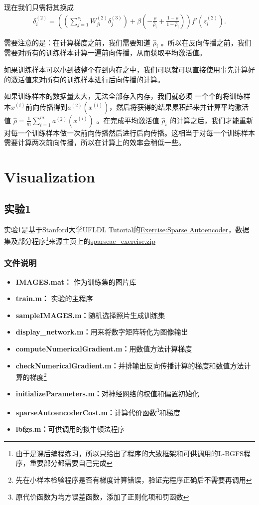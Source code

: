 现在我们只需将其换成
\begin{align}
\delta^{(2)}_i =
  \left( \left( \sum_{j=1}^{s_{2}} W^{(2)}_{ji} \delta^{(3)}_j \right)
+ \beta \left( - \frac{\rho}{\hat\rho_i} + \frac{1-\rho}{1-\hat\rho_i} \right) \right) f'(z^{(2)}_i) .
\nonumber \end{align}

需要注意的是：在计算梯度之前，我们需要知道 $ \hat\rho_i $ 。所以在反向传播之前，我们需要对所有的训练样本计算一遍前向传播，从而获取平均激活值。

如果训练样本可以小到被整个存到内存之中，我们可以就可以直接使用事先计算好的激活值来对所有的训练样本进行后向传播的计算。

如果训练样本的数据量太大，无法全部存入内存，我们就必须
一个个的将训练样本$x^{(i)}$前向传播得到$ a^{(2)}(x^{(i)})$，然后将获得的结果累积起来并计算平均激活值 $ \hat\rho = \frac{1}{m} \sum_{i=1}^m  a^{(2)}(x^{(i)})$ 。在完成平均激活值 $ \hat\rho_i$  的计算之后，我们才能重新对每一个训练样本做一次前向传播然后进行后向传播。这相当于对每一个训练样本需要计算两次前向传播，所以在计算上的效率会稍低一些。


\section{Visualization}
\subsection{实验1}
实验1是基于Stanford大学UFLDL Tutorial的\href{http://ufldl.stanford.edu/wiki/index.php/Exercise:Sparse_Autoencoder}{Exercise:Sparse Autoencoder}，数据集及部分程序\footnote{由于是课后编程练习，所以只给出了程序的大致框架和可供调用的L-BGFS程序，重要部分都需要自己完成}来源主页上的\href{http://ufldl.stanford.edu/wiki/resources/sparseae_exercise.zip}{sparseae\_exercise.zip}

\subsubsection*{文件说明}
\begin{itemize}
\item \textbf{IMAGES.mat：} 作为训练集的图片库
 \item \textbf{train.m：} 实验的主程序
 \item \textbf{sampleIMAGES.m：}随机选择照片生成训练集
  \item \textbf{display\_network.m：}用来将数字矩阵转化为图像输出
 \item \textbf{computeNumericalGradient.m：}用数值方法计算梯度
 \item \textbf{checkNumericalGradient.m：}并排输出反向传播计算的梯度和数值方法计算的梯度\footnote{先在小样本检验程序是否有梯度计算错误，验证完程序正确后不需要再调用}
 \item \textbf{initializeParameters.m：}对神经网络的权值和偏置初始化
 \item \textbf{sparseAutoencoderCost.m：}计算代价函数\footnote{原代价函数为均方误差函数，添加了正则化项和罚函数}和梯度
 \item \textbf{lbfgs.m：}可供调用的拟牛顿法程序
\end{itemize}

